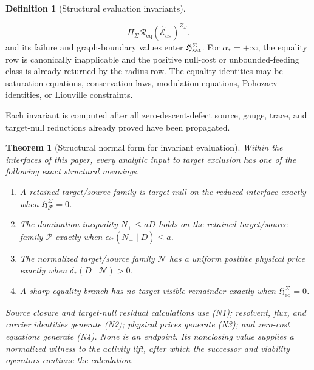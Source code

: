 \documentclass[11pt]{article}
\numberwithin{section}{part}
\theoremstyle{plain}
\newtheorem{theorem}{Theorem}[section]
\theoremstyle{definition}
\newtheorem{definition}[definition]{Definition}
\theoremstyle{remark}
\begin{document}
\begin{definition}[Structural evaluation invariants]
\begin{enumerate}[label=\textup{(I\arabic*)}]
\begin{equation}
{     \Pi_\Sigma\mathscr R_{\mathrm{eq}}
       (\widehat{\mathcal E}_{\alpha_*})}^{Z_\Sigma}.
  \end{equation}
  and its failure and graph-boundary values enter
  \(\mathfrak H_{\rm sat}^{\Sigma}\).  For \(\alpha_*=+\infty\), the
  equality row is canonically inapplicable and the positive null-cost or
  unbounded-feeding class is already returned by the radius row.
  The equality identities may be saturation equations, conservation laws,
  modulation equations, Pohozaev identities, or Liouville constraints.
\end{enumerate}
Each invariant is computed after all zero-descent-defect source, gauge,
trace, and target-null reductions already proved have been propagated.
\end{definition}

\begin{theorem}[Structural normal form for invariant evaluation]
\label{thm:structural-invariant-normal-form}
Within the interfaces of this paper, every analytic input to target exclusion
has one of the following exact structural meanings.
\begin{enumerate}[label=\textup{(N\arabic*)}]
\item A retained target/source family is target-null on the reduced interface exactly when
  \(\mathfrak H_{\mathcal F}^{\Sigma}=0\).
\item The domination inequality \(N_+\le aD\) holds on the retained
  target/source family \(\mathcal P\)
  exactly when \(\alpha_*(N_+\mid D)\le a\).
\item The normalized target/source family \(\mathcal N\) has a uniform positive physical
  price exactly when \(\delta_*(D\mid\mathcal N)>0\).
\item A sharp equality branch has no target-visible remainder exactly when
  \(\mathfrak H_{\mathrm{eq}}^{\Sigma}=0\).
\end{enumerate}
Source closure and target-null residual calculations use \textup{(N1)};
resolvent, flux, and carrier identities generate \textup{(N2)}; physical
prices generate \textup{(N3)}; and zero-cost equations generate
\textup{(N4)}.  None is an endpoint.  Its nonclosing value supplies a
normalized witness to the activity lift, after which the successor and
viability operators continue the calculation.
\end{theorem}
\end{document}

